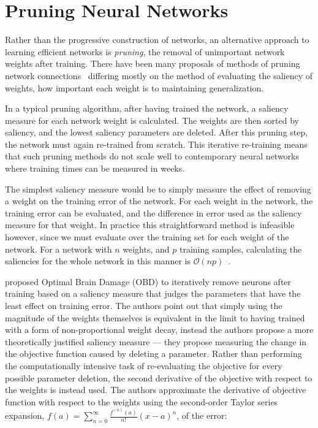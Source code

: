 \documentclass[thesis]{subfiles}
\begin{document}
	\section{Pruning Neural Networks}
    Rather than the progressive construction of networks, an alternative approach to learning efficient networks is \emph{pruning}, the removal of unimportant network weights after training. There have been many proposals of methods of pruning network connections~\citep{lecun1989optimal,sietsma1988neural,han2015deep,ullrich2017soft,}
 differing mostly on the method of evaluating the saliency of weights, \ie how important each weight is to maintaining generalization. 
    
    In a typical pruning algorithm, after having trained the network, a saliency measure for each network weight is calculated. The weights are then sorted by saliency, and the lowest saliency parameters are deleted. After this pruning step, the network must again re-trained from scratch. This iterative re-training means that such pruning methods do not scale well to contemporary neural networks where training times can be measured in weeks.

    The simplest saliency measure would be to simply measure the effect of removing a weight on the training error of the network. For each weight in the network, the training error can be evaluated, and the difference in error used as the saliency measure for that weight. In practice this straightforward method is infeasible however, since we must evaluate over the training set for each weight of the network. For a network with $n$ weights, and $p$ training samples, calculating the saliencies for the whole network in this manner is $\mathcal{O}(np)$~\citep{hanson1989comparing}.
    
    \citet{lecun1989optimal} proposed Optimal Brain Damage (OBD) to iteratively remove neurons after training based on a saliency measure that judges the parameters that have the least effect on training error. The authors point out that simply using the magnitude of the weights themselves is equivalent in the limit to having trained with a form of non-proportional weight decay, instead the authors propose a more theoretically justified saliency measure --- they propose measuring the change in the objective function caused by deleting a parameter. Rather than performing the computationally intensive task of re-evaluating the objective for every possible parameter deletion, the second derivative of the objective with respect to the weights is instead used. The authors approximate the derivative of objective function with respect to the weights using the second-order Taylor series expansion, $f(a) = \sum_{n=0}^\infty \frac{f^{(n)}(a)}{n!} (x - a)^n$, of the error:
       
\end{document}
